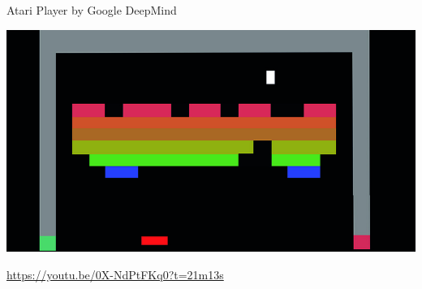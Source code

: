 \documentclass{beamer}
\begin{document}
  {
    \begin{frame}{Atari Player by Google DeepMind}
      \begin{center}
        \includegraphics[width=\textwidth, height=\textheight, keepaspectratio]{../img/atari_breakout.jpg}

        \url{https://youtu.be/0X-NdPtFKq0?t=21m13s}
      \end{center}
    \end{frame}
  }
\end{document}
